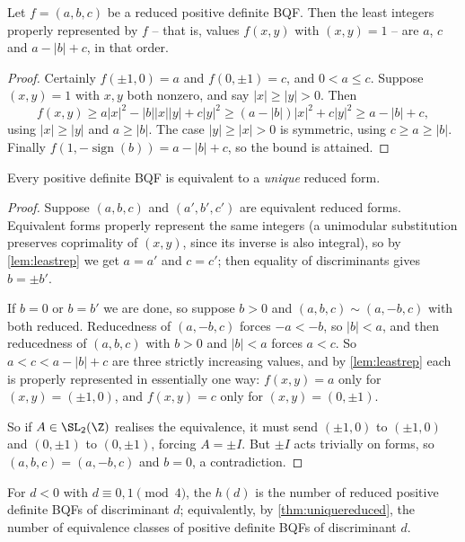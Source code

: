 \begin{lemma}\label{lem:leastrep}
	Let $f = (a,b,c)$ be a reduced positive definite BQF. Then the least integers properly represented by $f$ -- that is, values $f(x,y)$ with $(x,y) = 1$ -- are $a$, $c$ and $a - |b| + c$, in that order.
\end{lemma}
\begin{proof}
	Certainly $f(\pm 1, 0) = a$ and $f(0, \pm 1) = c$, and $0 < a \leq c$. Suppose $(x,y) = 1$ with $x, y$ both nonzero, and say $|x| \geq |y| > 0$. Then
	$$
	f(x,y) \geq a|x|^2 - |b||x||y| + c|y|^2 \geq (a - |b|)|x|^2 + c|y|^2 \geq a - |b| + c,
	$$
	using $|x| \geq |y|$ and $a \geq |b|$. The case $|y| \geq |x| > 0$ is symmetric, using $c \geq a \geq |b|$. Finally $f(1, -\operatorname{sign}(b)) = a - |b| + c$, so the bound is attained.
\end{proof}

\begin{theorem}\label{thm:uniquereduced}
	Every positive definite BQF is equivalent to a \emph{unique} reduced form.
\end{theorem}
\begin{proof}
	Suppose $(a,b,c)$ and $(a',b',c')$ are equivalent reduced forms. Equivalent forms properly represent the same integers (a unimodular substitution preserves coprimality of $(x,y)$, since its inverse is also integral), so by \autoref{lem:leastrep} we get $a = a'$ and $c = c'$; then equality of discriminants gives $b = \pm b'$.

	If $b = 0$ or $b = b'$ we are done, so suppose $b > 0$ and $(a,b,c) \sim (a,-b,c)$ with both reduced. Reducedness of $(a,-b,c)$ forces $-a < -b$, so $|b| < a$, and then reducedness of $(a,b,c)$ with $b>0$ and $|b|<a$ forces $a < c$. So $a < c < a - |b| + c$ are three strictly increasing values, and by \autoref{lem:leastrep} each is properly represented in essentially one way: $f(x,y) = a$ only for $(x,y) = (\pm1, 0)$, and $f(x,y) = c$ only for $(x,y) = (0,\pm1)$.

	So if $A \in \SL_2(\Z)$ realises the equivalence, it must send $(\pm 1, 0)$ to $(\pm 1, 0)$ and $(0, \pm 1)$ to $(0, \pm1)$, forcing $A = \pm I$. But $\pm I$ acts trivially on forms, so $(a,b,c) = (a,-b,c)$ and $b = 0$, a contradiction.
\end{proof}

\begin{definition}
	For $d < 0$ with $d \equiv 0, 1 \pmod 4$, the  $h(d)$ is the number of reduced positive definite BQFs of discriminant $d$; equivalently, by \autoref{thm:uniquereduced}, the number of equivalence classes of positive definite BQFs of discriminant $d$.
\end{definition}

